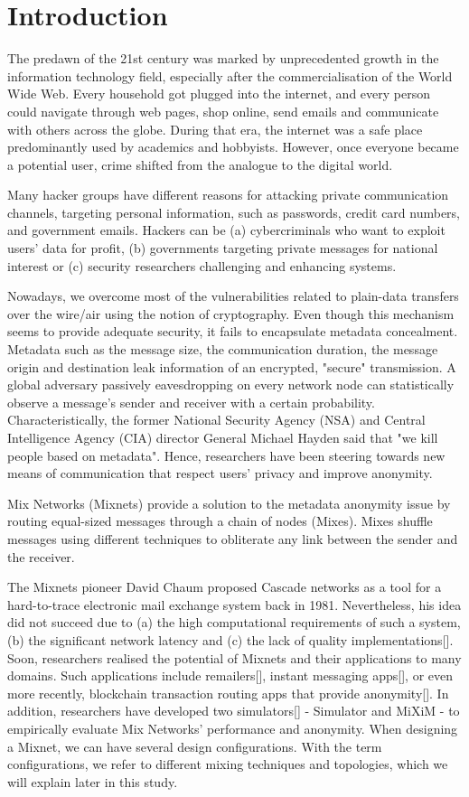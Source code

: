 \documentclass[logo,msc,cyber]{infthesis}   %
\begin{document}
\chapter{Introduction}

The predawn of the 21st century was marked by unprecedented growth in the
information technology field, especially after the commercialisation of the
World Wide Web. Every household got plugged into the internet, and every person
could navigate through web pages, shop online, send emails and communicate with
others across the globe. During that era, the internet was a safe place
predominantly used by academics and hobbyists. However, once everyone became a
potential user, crime shifted from the analogue to the digital world.

Many hacker groups have different reasons for attacking private communication
channels, targeting personal information, such as passwords, credit card
numbers, and government emails. Hackers can be (a) cybercriminals who want to
exploit users' data for profit, (b) governments targeting private messages for
national interest or (c) security researchers challenging and enhancing systems.


Nowadays, we overcome most of the vulnerabilities related to plain-data
transfers over the wire/air using the notion of cryptography. Even though this
mechanism seems to provide adequate security, it fails to encapsulate metadata
concealment. Metadata such as the message size, the communication duration, the
message origin and destination leak information of an encrypted, "secure"
transmission. A global adversary passively eavesdropping on every network node
can statistically observe a message's sender and receiver with a certain
probability. Characteristically, the former National Security Agency (NSA) and
Central Intelligence Agency (CIA) director General Michael Hayden said that "we
kill people based on metadata". Hence, researchers have been steering towards
new means of communication that respect users' privacy and improve anonymity.

Mix Networks (Mixnets) provide a solution to the metadata anonymity issue by
routing equal-sized messages through a chain of nodes (Mixes). Mixes shuffle
messages using different techniques to obliterate any link between the sender
and the receiver. 

The Mixnets pioneer David Chaum proposed Cascade networks as a tool for a
hard-to-trace electronic mail exchange system back in 1981. Nevertheless, his
idea did not succeed due to (a) the high computational requirements of such a
system, (b) the significant network latency and (c) the lack of quality
implementations[]. Soon, researchers realised the potential of Mixnets and their
applications to many domains. Such applications include remailers[], instant
messaging apps[], or even more recently, blockchain transaction routing apps
that provide anonymity[]. In addition, researchers have developed two
simulators[] - Simulator and MiXiM - to empirically evaluate Mix Networks'
performance and anonymity. When designing a Mixnet, we can have several design
configurations. With the term configurations, we refer to different mixing
techniques and topologies, which we will explain later in this study.
\end{document}
